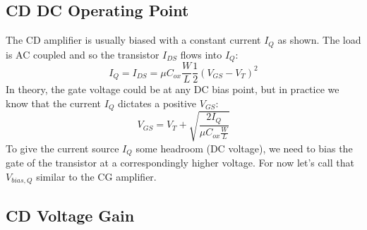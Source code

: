 \subsection{CD DC Operating Point}

The CD amplifier is usually biased with a constant current $I_Q$ as shown.  The load is AC coupled and so the transistor $I_{DS}$ flows into $I_Q$:
%
\begin{equation}
	I_Q = {I_{DS}} = \mu {C_{ox}}\frac{W}{L}\frac{1}{2}{({V_{GS}} - {V_T})^2}	
\end{equation}
%
In theory, the gate voltage could be at any DC bias point, but in practice we know that the current $I_Q$ dictates a positive $V_{GS}$:
%  
\begin{equation}
	{V_{GS}} = {V_T} + \sqrt {\frac{{2{I_{Q}}}}{{\mu {C_{ox}}\frac{W}{L}}}} 
\end{equation}
%
To give the current source $I_Q$ some headroom (DC voltage), we need to bias the gate of the transistor at a correspondingly higher voltage.  For now let's call that $V_{bias,Q}$ similar to the CG amplifier.


\subsection{CD Voltage Gain}

